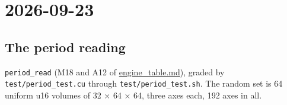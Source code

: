 \section{\texorpdfstring{2026-09-23}{2026-09-23}}

\subsection{\texorpdfstring{The period reading}{The period reading}}

\texttt{period\_\allowbreak{}read} (M18 and A12 of \hyperref[chap:engine-table]{engine\_\allowbreak{}table.md}), graded by \texttt{test/\allowbreak{}period\_\allowbreak{}test.\allowbreak{}cu} through \texttt{test/\allowbreak{}period\_\allowbreak{}test.\allowbreak{}sh}. The random set is 64 uniform u16 volumes of 32 × 64 × 64, three axes each, 192 axes in all.

